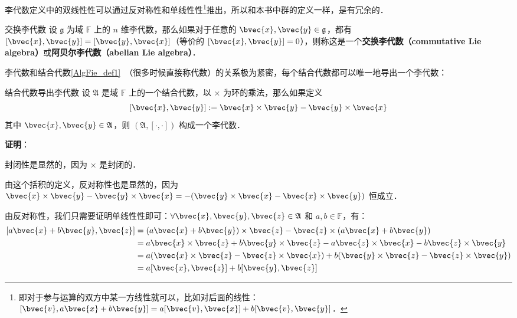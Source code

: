 
李代数定义中的双线性性可以通过反对称性和单线性性\footnote{即对于参与运算的双方中某一方线性就可以，比如对后面的线性：$[\bvec{v},a\bvec{x}+b\bvec{y}]=a[\bvec{v}, \bvec{x}]+b[\bvec{v}, \bvec{y}]$．}推出，所以和本书中群的定义一样，是有冗余的．

\begin{definition}{交换李代数}
设 $\mathfrak{g}$ 为域 $\mathbb{F}$ 上的 $n$ 维李代数，那么如果对于任意的 $\bvec{x},\bvec{y}\in\mathfrak{g}$，都有 $[\bvec{x}, \bvec{y}] = [\bvec{y}, \bvec{x}]$（等价的 $[\bvec{x}, \bvec{y}] = 0$），则称这是一个\textbf{交换李代数（commutative Lie algebra）}或\textbf{阿贝尔李代数（abelian Lie algebra）}．
\end{definition}

李代数和结合代数\autoref{AlgFie_def1}~（很多时候直接称代数）的关系极为紧密，每个结合代数都可以唯一地导出一个李代数：

\begin{theorem}{结合代数导出李代数}\label{LieAlg_the2}
设 $\mathfrak{A}$ 是域 $\mathbb{F}$ 上的一个结合代数，以 $\times$ 为环的乘法，那么如果定义
$$
[\bvec{x}, \bvec{y}] := \bvec{x}\times \bvec{y}-\bvec{y}\times \bvec{x}
$$
其中 $\bvec{x}, \bvec{y}\in\mathfrak{A}$，则 $(\mathfrak{A}, [\cdot, \cdot])$ 构成一个李代数．
\end{theorem}

\textbf{证明}：

封闭性是显然的，因为 $\times$ 是封闭的．

由这个括积的定义，反对称性也是显然的，因为 $\bvec{x}\times \bvec{y}-\bvec{y}\times \bvec{x}=-(\bvec{y}\times \bvec{x}-\bvec{x}\times \bvec{y})$ 恒成立．

由反对称性，我们只需要证明单线性性即可：$\forall \bvec{x}, \bvec{y}, \bvec{z}\in\frak{A}$ 和 $a, b\in\mathbb{F}$，有：
\begin{equation}
\begin{aligned}
{[a\bvec{x}+b\bvec{y}, \bvec{z}]}&=(a\bvec{x}+b\bvec{y})\times\bvec{z}-\bvec{z}\times(a\bvec{x}+b\bvec{y})\\
&=a\bvec{x}\times\bvec{z}+b\bvec{y}\times\bvec{z}-a\bvec{z}\times\bvec{x}-b\bvec{z}\times\bvec{y}\\
&=a(\bvec{x}\times\bvec{z}-\bvec{z}\times\bvec{x})+b(\bvec{y}\times\bvec{z}-\bvec{z}\times\bvec{y})\\
&=a[\bvec{x}, \bvec{z}]+b[\bvec{y}, \bvec{z}]
\end{aligned}
\end{equation}

